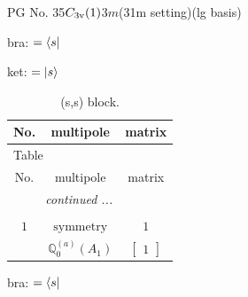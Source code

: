\documentclass[fleqn,8pt,landscape]{jsarticle}
\begin{document}
\setcounter{MaxMatrixCols}{32}

\renewcommand{\tablename}{Table~}
\renewcommand{\figurename}{Figure~}
\begin{center}
\LARGE
PG No. 35\quad$C_{\rm 3v}(1)$\quad$3m$\quad(31m setting)\quad[ trigonal ] (lg basis)
\end{center}
bra: $=\bra{s}$

\noindent
ket: $=\ket{s}$
\renewcommand{\arraystretch}{1.6}
\begin{longtable}{ccc}
\caption{(s,s) block.}
 \\
 \hline \hline
No. & multipole & matrix \\ \hline \endfirsthead

\multicolumn{2}{l}{\tablename\ \thetable{}} \\
 \hline \hline
No. & multipole & matrix \\ \hline \endhead

 \hline \hline
\multicolumn{2}{r}{\footnotesize\it continued ...} \\ \endfoot

 \hline \hline
\multicolumn{2}{r}{} \\ \endlastfoot

$ 1 $ & $ \text{symmetry} $ & $ 1 $ \\
$  $ & $ \mathbb{Q}_{0}^{(a)}(A_{1}) $ & $ \begin{bmatrix} 1 \end{bmatrix} $ \\ \hline
\end{longtable}
bra: $=\bra{s}$
\end{document}
